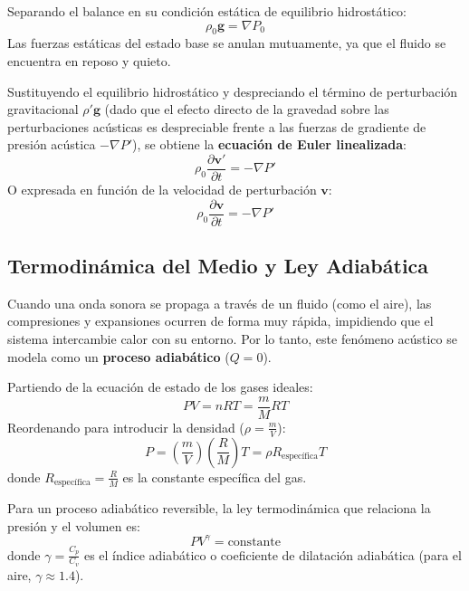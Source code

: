 \documentclass[11pt,letterpaper]{article}
\begin{document}
Separando el balance en su condición estática de equilibrio hidrostático:
\begin{equation}
    \rho_0 \mathbf{g} = \nabla P_0
\end{equation}
Las fuerzas estáticas del estado base se anulan mutuamente, ya que el fluido se encuentra en reposo y quieto. 

Sustituyendo el equilibrio hidrostático y despreciando el término de perturbación gravitacional $\rho'\mathbf{g}$ (dado que el efecto directo de la gravedad sobre las perturbaciones acústicas es despreciable frente a las fuerzas de gradiente de presión acústica $-\nabla P'$), se obtiene la \textbf{ecuación de Euler linealizada}:
\begin{equation}
    \rho_0 \frac{\partial \mathbf{v}'}{\partial t} = -\nabla P'
\end{equation}
O expresada en función de la velocidad de perturbación $\mathbf{v}$:
\begin{equation}
    \rho_0 \frac{\partial \mathbf{v}}{\partial t} = -\nabla P'
\end{equation}

\subsection{Termodinámica del Medio y Ley Adiabática}

Cuando una onda sonora se propaga a través de un fluido (como el aire), las compresiones y expansiones ocurren de forma muy rápida, impidiendo que el sistema intercambie calor con su entorno. Por lo tanto, este fenómeno acústico se modela como un \textbf{proceso adiabático} ($Q = 0$).

Partiendo de la ecuación de estado de los gases ideales:
\begin{equation}
    P V = n R T = \frac{m}{M} R T
\end{equation}
Reordenando para introducir la densidad ($\rho = \frac{m}{V}$):
\begin{equation}
    P = \left(\frac{m}{V}\right) \left(\frac{R}{M}\right) T = \rho R_{\text{específica}} T
\end{equation}
donde $R_{\text{específica}} = \frac{R}{M}$ es la constante específica del gas.

Para un proceso adiabático reversible, la ley termodinámica que relaciona la presión y el volumen es:
\begin{equation}
    P V^\gamma = \text{constante}
\end{equation}
donde $\gamma = \frac{C_p}{C_v}$ es el índice adiabático o coeficiente de dilatación adiabática (para el aire, $\gamma \approx 1.4$). 
\end{document}
